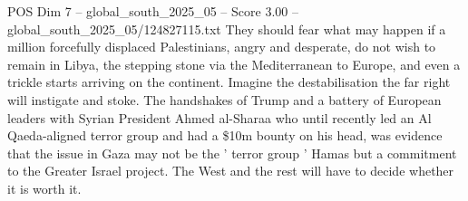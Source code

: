 \begin{textsample}{POS Dim 7 – global\_south\_2025\_05 – Score 3.00 – global\_south\_2025\_05/124827115.txt}
They should fear what may happen if a million forcefully displaced Palestinians, angry and desperate, do not wish to remain in Libya, the stepping stone via the Mediterranean to Europe, and even a trickle starts arriving on the continent.
Imagine the destabilisation the far right will instigate and stoke.
The handshakes of Trump and a battery of European leaders with Syrian President Ahmed al-Sharaa who until recently led an Al Qaeda-aligned terror group and had a \$10m bounty on his head, was evidence that the issue in Gaza may not be the ' terror group ' Hamas but a commitment to the Greater Israel project.
The West and the rest will have to decide whether it is worth it.

\end{textsample}

